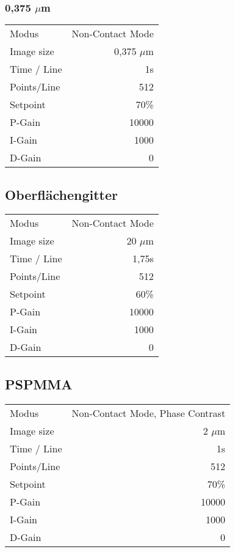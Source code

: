 \subsubsection*{0,375 $\mu$m}
\begin{center}
    \centering
    \begin{tabular}{l|r}
        Modus & Non-Contact Mode\\
        Image size & 0,375 $\mu$m \\
        Time / Line & 1s \\
        Points/Line & 512\\
        Setpoint & 70\% \\
        P-Gain & 10000 \\
        I-Gain & 1000 \\
        D-Gain & 0 \\
        
    \end{tabular}
\end{center}

\subsection*{Oberflächengitter}

\begin{center}
    \centering
    \begin{tabular}{l|r}
        Modus & Non-Contact Mode\\
        Image size & 20 $\mu$m \\
        Time / Line & 1,75s \\
        Points/Line & 512\\
        Setpoint & 60\% \\
        P-Gain & 10000 \\
        I-Gain & 1000 \\
        D-Gain & 0 \\
        
    \end{tabular}
\end{center}

\subsection*{PSPMMA}

\begin{center}
    \centering
    \begin{tabular}{l|r}
        Modus & Non-Contact Mode, Phase Contrast\\
        Image size & 2 $\mu$m \\
        Time / Line & 1s \\
        Points/Line & 512\\
        Setpoint & 70\% \\
        P-Gain & 10000 \\
        I-Gain & 1000 \\
        D-Gain & 0 \\
        
    \end{tabular}
\end{center}




